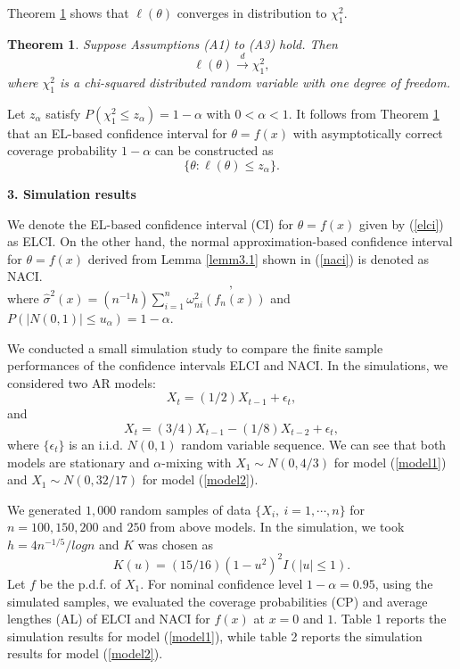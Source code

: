 \documentclass[12pt]{article}
\newtheorem{theo}{\sc Theorem}
\newcommand{\tod}{\stackrel{d}{\longrightarrow}}
\def\be{\begin{equation}}
\def\ee{\end{equation}}
\begin{document}
\smallskip

Theorem \ref{theo3.1}
shows that $\ell(\theta)$ converges in distribution  to $\chi^2_1$.
\begin{theo}\label{theo3.1}
Suppose Assumptions (A1) to (A3) hold. Then
\[
\ell(\theta)\tod \chi^2_1, \label{lim00.01}
\]
where $\chi^2_1$ is a chi-squared distributed random variable with
one  degree of freedom.
\end{theo}


Let $z_{\alpha}$ satisfy  $P(\chi^2_1\leq z_{\alpha})=1-\alpha$ with $0<\alpha<1$.
It follows from Theorem \ref{theo3.1} that an EL-based confidence interval for $\theta=f(x)$ with asymptotically correct
coverage probability $1-\alpha$ can be constructed as
\be
\{ \theta: \ell(\theta)\leq z_{\alpha} \}. \label{elci}
\ee


\bigskip
\setcounter{section}{3}
\setcounter{equation}{0}
 \noindent
{\bf 3. Simulation results}
\bigskip


We denote the EL-based confidence interval (CI) for $\theta=f(x)$ given by (\ref{elci})  as ELCI. On the other hand,
the normal approximation-based confidence interval for $\theta=f(x)$ derived from Lemma \ref{lemm3.1} shown in (\ref{naci}) is denoted as NACI.
\be
[f_n(x)-\hat{\sigma}(x)u_{\alpha}/(nh)^{1/2},     f_n(x)+\hat{\sigma}(x)u_{\alpha}/(nh)^{1/2} ],  \label{naci}
\ee
where $\hat{\sigma}^2(x)=(n^{-1}h)\sum^{n}_{i=1}\omega^2_{ni}(f_n(x))$ and $P(|N(0, 1)|\leq u_{\alpha})=1-\alpha$.


We conducted a small simulation study  to compare the finite sample performances of the confidence intervals ELCI and NACI.
In the simulations, we considered two AR models:
\be
X_t=(1/2)X_{t-1}+\epsilon_t,     \label{model1}
\ee
and
\be
X_t=(3/4)X_{t-1}-(1/8)X_{t-2}+\epsilon_t,  \label{model2}
\ee
where $\{\epsilon_t\}$ is an i.i.d. $N(0, 1)$ random variable sequence. We can see that both models are stationary and $\alpha$-mixing with $X_1\sim N(0, 4/3)$
for model (\ref{model1}) and  $X_1\sim N(0, 32/17)$
for model (\ref{model2}).


We generated $1,000$ random samples of  data $\{X_{i}, \ i=1,
\cdots, n\}$ for $n=100, 150, 200$ and $250$ from above  models.
 In the simulation,  we took $h=4n^{-1/5}/log n$ and
$K$ was chosen as
\[
K(u)=(15/ 16)(1-u^2)^2I(|u|\leq 1).
\]
Let $f$ be the p.d.f. of $X_1$. For nominal confidence level $1-\alpha=0.95$, using the simulated samples, we evaluated the
coverage probabilities (CP) and average lengthes (AL)
of ELCI and NACI for $f(x)$ at $x=0$ and $1$. Table 1 reports the simulation results for model (\ref{model1}), while table 2 reports
the simulation results for model (\ref{model2}).
\end{document}
